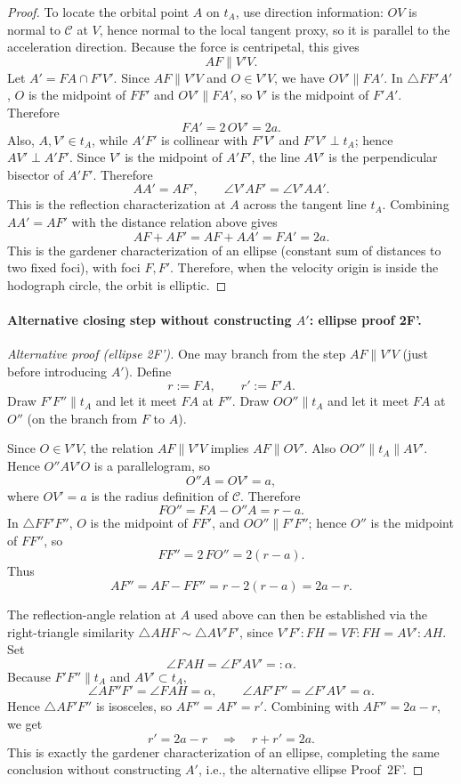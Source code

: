 \begin{proof}
To locate the orbital point $A$ on $t_A$, use direction information: $OV$ is normal to $\mathcal C$ at $V$, hence normal to the local tangent proxy, so it is parallel to the acceleration direction. Because the force is centripetal, this gives
\[
  AF\parallel V'V.
\]
Let $A'=FA\cap F'V'$. Since $AF\parallel V'V$ and $O\in V'V$, we have $OV'\parallel FA'$. In $\triangle FF'A'$, $O$ is the midpoint of $FF'$ and $OV'\parallel FA'$, so $V'$ is the midpoint of $F'A'$. Therefore
\[
  FA'=2\,OV'=2a.
\]
Also, $A,V'\in t_A$, while $A'F'$ is collinear with $F'V'$ and $F'V'\perp t_A$; hence $AV'\perp A'F'$. Since $V'$ is the midpoint of $A'F'$, the line $AV'$ is the perpendicular bisector of $A'F'$. Therefore
\[
  AA'=AF',
  \qquad
  \angle V'AF'=\angle V'AA'.
\]
This is the reflection characterization at $A$ across the tangent line $t_A$. Combining $AA'=AF'$ with the distance relation above gives
\[
  AF+AF' = AF+AA' = FA' = 2a.
\]
This is the gardener characterization of an ellipse (constant sum of distances to two fixed foci), with foci $F,F'$. Therefore, when the velocity origin is inside the hodograph circle, the orbit is elliptic.
\end{proof}

\paragraph{Alternative closing step without constructing \(A'\): ellipse proof 2F'.}
\begin{proof}[Alternative proof (ellipse 2F')]
One may branch from the step \(AF\parallel V'V\) (just before introducing \(A'\)). Define
\[
  r:=FA,
  \qquad
  r':=F'A.
\]
Draw \(F'F''\parallel t_A\) and let it meet \(FA\) at \(F''\). Draw \(OO''\parallel t_A\) and let it meet \(FA\) at \(O''\) (on the branch from \(F\) to \(A\)).

Since \(O\in V'V\), the relation \(AF\parallel V'V\) implies \(AF\parallel OV'\). Also \(OO''\parallel t_A\parallel AV'\). Hence \(O''AV'O\) is a parallelogram, so
\[
  O''A=OV'=a,
\]
where \(OV'=a\) is the radius definition of \(\mathcal C\). Therefore
\[
  FO''=FA-O''A=r-a.
\]
In \(\triangle FF'F''\), \(O\) is the midpoint of \(FF'\), and \(OO''\parallel F'F''\); hence \(O''\) is the midpoint of \(FF''\), so
\[
  FF''=2\,FO''=2(r-a).
\]
Thus
\[
  AF''=AF-FF''=r-2(r-a)=2a-r.
\]

The reflection-angle relation at \(A\) used above can then be established via the right-triangle similarity \(\triangle AHF\sim\triangle AV'F'\), since \(V'F':FH=VF:FH=AV':AH\). Set
\[
  \angle FAH=\angle F'AV'=: \alpha.
\]
Because \(F'F''\parallel t_A\) and \(AV'\subset t_A\),
\[
  \angle AF''F'=\angle FAH=\alpha,
  \qquad
  \angle AF'F''=\angle F'AV'=\alpha.
\]
Hence \(\triangle AF'F''\) is isosceles, so \(AF''=AF'=r'\). Combining with \(AF''=2a-r\), we get
\[
  r'=2a-r
  \quad\Longrightarrow\quad
  r+r'=2a.
\]
This is exactly the gardener characterization of an ellipse, completing the same conclusion without constructing \(A'\), i.e., the alternative ellipse Proof~2F'.
\end{proof}

